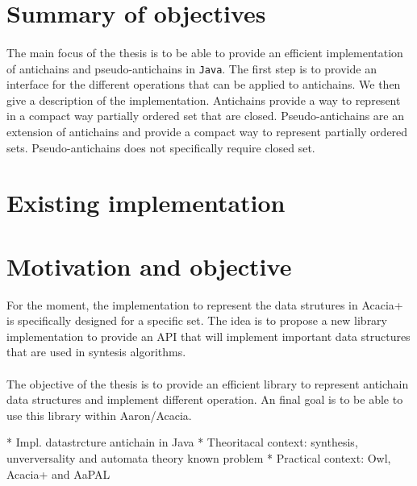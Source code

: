 \documentclass[letterpaper]{memoir}
\begin{document}
\section{Summary of objectives}

\paragraph{}


The main focus of the thesis is to be able to provide an efficient
implementation of antichains and pseudo-antichains in \texttt{Java}.
The first step is to provide an interface for the different operations that
can be applied to antichains. We then give a description of the implementation.
Antichains provide a way to represent
in a compact way partially ordered set that are closed. Pseudo-antichains
are an extension of antichains and provide a compact way to represent
partially ordered sets. Pseudo-antichains does not specifically require
closed set.



\section{Existing implementation}





\section{Motivation and objective}

For the moment, the implementation to represent the data strutures in
 Acacia+
is specifically designed for a specific set. The idea is to propose a new
library implementation to provide an API that will implement important
data structures that are used in syntesis algorithms.

\paragraph{}

The objective of the thesis is to provide an efficient library to represent
antichain data structures and implement different operation. An final
goal is to be able to use this library within Aaron/Acacia.


* Impl. datastrcture antichain in Java
* Theoritacal context: synthesis,
unverversality and automata theory known problem
* Practical context: Owl, Acacia+ and AaPAL
\end{document}
